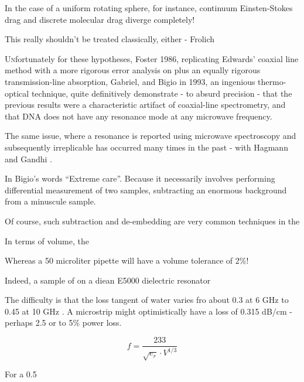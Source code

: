 \documentclass[paper.tex]{subfiles}
\begin{document}
\begin{multicols}{1}
In the case of a uniform rotating sphere\cite{Molecular1963}, for instance, continuum Einsten-Stokes drag and discrete molecular drag diverge completely!

This really shouldn’t be treated classically, either - Frolich 

\lettrine{U}nfortunately for these hypotheses, Foster 1986, replicating Edwards’ coaxial line method with a more rigorous error analysis on plus an equally rigorous transmission-line absorption, Gabriel, and Bigio in 1993, an ingenious thermo-optical technique, quite definitively demonstrate - to absurd precision -  that the previous results were a characteristic artifact of coaxial-line spectrometry, and that DNA does not have any resonance mode at any microwave frequency.

The same issue, where a resonance is reported using microwave spectroscopy and subsequently irreplicable has occurred many times in the past - with Hagmann and Gandhi \cite{Substitution1982}. 

In Bigio’s words “Extreme care”. Because it necessarily involves performing differential measurement of two samples, subtracting an enormous background from a minuscule sample.

Of course, such subtraction and de-embedding are very common techniques in the 

In terms of volume, the 


Whereas a 50 microliter pipette will have a volume tolerance of 2\%! 




Indeed, a sample of on a diean E5000 dielectric resonator 

The difficulty is that the loss tangent of water varies fro about 0.3 at 6 GHz to 0.45 at 10 GHz \cite{Metamaterial2015}. A microstrip might optimistically have a loss of 0.315 dB/cm - perhaps 2.5 or to 5\% power loss. 

$$f = \frac{233}{\sqrt{e_r}\cdot{V^{1/3}}}$$






For a 0.5%


\end{multicols}
\end{document}
